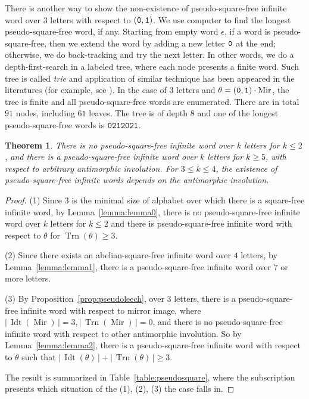 \documentclass[12pt]{article}
\def\abs#1{{|\,#1\,|}}
\def\mirror{{\operatorname{Mir}}}
\def\id{{\operatorname{Idt}}}
\def\tr{{\operatorname{Trn}}}
\def\mtt#1{{\tt #1}}
\newtheorem{theorem}{Theorem}
\begin{document}
There is another way to show the non-existence of pseudo-square-free
infinite word over $3$ letters with respect to $(\mtt0,\mtt1)$. We
use computer to find the longest pseudo-square-free word, if any.
Starting from empty word $\epsilon$, if a word is
pseudo-square-free, then we extend the word by adding a new letter
$\mtt0$ at the end; otherwise, we do back-tracking and try the next
letter. In other words, we do a depth-first-search in a labeled
tree, where each node presents a finite word. Such tree is called
\emph{trie} and application of similar technique has been appeared
in the literatures (for example, see \cite{Shallit2004}). In the
case of $3$ letters and $\theta=(\mtt0,\mtt1)\cdot\mirror$, the tree
is finite and all pseudo-square-free words are enumerated. There are
in total $91$ nodes, including $61$ leaves. The tree is of depth $8$
and one of the longest pseudo-square-free words is
$\mtt0\mtt2\mtt1\mtt2\mtt0\mtt2\mtt1$.


\begin{theorem}
There is no pseudo-square-free infinite word over $k$ letters for
$k\leq 2$, and there is a pseudo-square-free infinite word over $k$
letters for $k\geq 5$, with respect to arbitrary antimorphic
involution. For $3\leq k\leq 4$, the existence of pseudo-square-free
infinite words depends on the antimorphic involution.
\end{theorem}
\begin{proof}
(1) Since $3$ is the minimal size of alphabet over which there is a
square-free infinite word, by Lemma~\ref{lemma:lemma0}, there is no
pseudo-square-free infinite word over $k$ letters for $k\leq 2$ and
there is pseudo-square-free infinite word with respect to $\theta$
for $\tr(\theta)\geq 3$.

(2) Since there exists an abelian-square-free infinite word over $4$
letters, by Lemma~\ref{lemma:lemma1}, there is a pseudo-square-free
infinite word over $7$ or more letters.

(3) By Proposition~\ref{prop:pseudoleech}, over $3$ letters, there
is a pseudo-square-free infinite word with respect to mirror image,
where $\abs{\id(\mirror)}=3,\abs{\tr(\mirror)}=0$, and there is no
pseudo-square-free infinite word with respect to other antimorphic
involution. So by Lemma~\ref{lemma:lemma2}, there is a
pseudo-square-free infinite word with respect to $\theta$ such that
$\abs{\id(\theta)}+\abs{\tr(\theta)}\geq 3$.

The result is summarized in Table~\ref{table:pseudosquare}, where
the subscription presents which situation of the (1), (2), (3) the
case falls in.
\end{proof}
\end{document}
